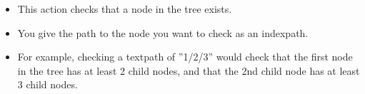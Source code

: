 \begin{itemize}
\item This action checks that a node in the tree exists.
\item You give the path to the node you want to check as an indexpath. 
\item For example, checking a textpath of ''1/2/3'' would check that the first node in the tree has at least 2 child nodes, and that the 2nd child node has at least 3 child nodes.
\end{itemize}
